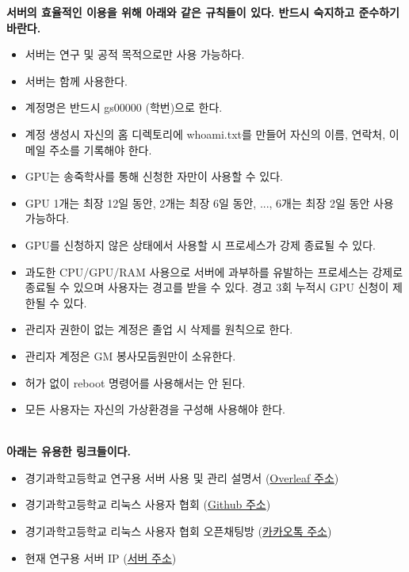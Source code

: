 \begin{acknowledgements}
\textbf{
서버의 효율적인 이용을 위해 아래와 같은 규칙들이 있다. 반드시 숙지하고 준수하기 바란다.}
~\\


\begin{itemize}
 \item 서버는 연구 및 공적 목적으로만 사용 가능하다.
 \item 서버는 함께 사용한다.
 \item 계정명은 반드시 gs00000 (학번)으로 한다.
 \item 계정 생성시 자신의 홈 디렉토리에 whoami.txt를 만들어 자신의 이름, 연락처, 이메일 주소를 기록해야 한다.
 \item GPU는 송죽학사를 통해 신청한 자만이 사용할 수 있다.
 \item GPU 1개는 최장 12일 동안, 2개는 최장 6일 동안, ..., 6개는 최장 2일 동안 사용 가능하다.
 \item GPU를 신청하지 않은 상태에서 사용할 시 프로세스가 강제 종료될 수 있다.
 \item 과도한 CPU/GPU/RAM 사용으로 서버에 과부하를 유발하는 프로세스는 강제로 종료될 수 있으며 사용자는 경고를 받을 수 있다. 경고 3회 누적시 GPU 신청이 제한될 수 있다.
 \item 관리자 권한이 없는 계정은 졸업 시 삭제를 원칙으로 한다.
 \item 관리자 계정은 GM 봉사모둠원만이 소유한다.
 \item 허가 없이 reboot 명령어를 사용해서는 안 된다.
 \item 모든 사용자는 자신의 가상환경을 구성해 사용해야 한다.
\end{itemize}~\\



\textbf{
아래는 유용한 링크들이다.}
~\\
\begin{itemize}
 \item 경기과학고등학교 연구용 서버 사용 및 관리 설명서 (\href{https://www.overleaf.com/project/60a1d2365a26a733e5a9b16f}{Overleaf 주소})
 \item 경기과학고등학교 리눅스 사용자 협회 (\href{https://github.com/gshslinuxintro}{Github 주소})
 \item 경기과학고등학교 리눅스 사용자 협회 오픈채팅방 (\href{https://open.kakao.com/o/gL8MCked}{카카오톡 주소})
 \item 현재 연구용 서버 IP (\href{http://115.23.235.135}{서버 주소})
\end{itemize}~\\
\end{acknowledgements}